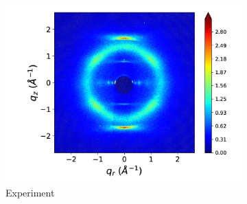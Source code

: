\documentclass{article}
\begin{document}
\begin{figure}[h]
\begin{subfigure}{0.33\textwidth}
                \centering
                \includegraphics[width=\textwidth]{WAXS_raw.png}
                \caption{Experiment}\label{fig:xrd_exp}
        \end{subfigure}
	\caption{}\label{fig:xrd}
\end{figure}
\end{document}
